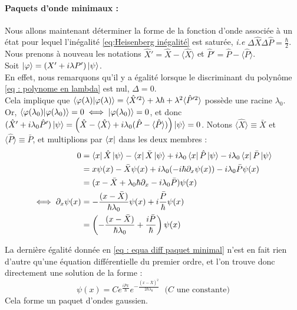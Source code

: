 \documentclass{article}
\begin{document}
\paragraph{Paquets d'onde minimaux :} Nous allons maintenant déterminer la forme de la fonction d'onde associée à un état pour lequel l'inégalité \eqref{eq:Heisenberg inégalité} est saturée, \textit{i.e} $\Delta \hat{X} \Delta \hat{P} = \frac{\hbar}{2}$. \\

Nous prenons à nouveau les notations $\hat{X}' = \hat{X} - \langle \hat{X} \rangle$ et $\hat{P}' = \hat{P} - \langle \hat{P} \rangle$. \\
Soit $\ket{\varphi} = (X' + i\lambda P') \ket{\psi}$. \\
En effet, nous remarquons qu'il y a égalité lorsque le discriminant du polynôme \eqref{eq : polynome en lambda} est nul, $\Delta = 0$. \\
Cela implique que $\braket{\varphi(\lambda) | \varphi(\lambda)} =  \langle \hat{X}'^2 \rangle + \lambda \hbar + \lambda^2 \langle \hat{P}'^2 \rangle$ possède une racine $\lambda_0$. \\
Or, $\braket{\varphi(\lambda_0) | \varphi(\lambda_0)} = 0 \iff \ket{\varphi(\lambda_0)} =0$, et donc $(\hat{X}' + i\lambda_0 \hat{P}')\ket{\psi} = \left( \hat{X} - \langle \hat{X} \rangle + i\lambda_0 (\hat{P} - \langle \hat{P} \rangle) \right) \ket{\psi} =0$.
Notons $\langle \hat{X} \rangle \equiv \bar{X}$ et $\langle \hat{P} \rangle \equiv \bar{P}$, et multiplions par $\bra{x}$ dans les deux membres : \\
\begin{align}
    0&= \bra{x} \hat{X} \ket{\psi} - \bra{x} \bar{X} \ket{\psi} + i \lambda_0 \bra{x} \hat{P} \ket{\psi} - i\lambda_0 \bra{x} \bar{P} \ket{\psi} \notag \\
    &= x \psi(x) - \bar{X} \psi(x) + i\lambda_0(-i\hbar \partial_x \psi(x)) - i\lambda_0 \bar{P} \psi(x) \notag \\
    &= (x - \bar{X} + \lambda_0 \hbar \partial_x -i \lambda_0 \bar{P}) \psi(x) \notag \\
    \iff \partial_x \psi(x) &= - \frac{(x- \bar{X})}{\hbar \lambda_0} \psi(x) + i \frac{\bar{P}}{\hbar} \psi(x) \notag \\
    &= \left( -\frac{(x-\bar{X})}{\hbar \lambda_0} + \frac{i\bar{P}}{\hbar} \right) \psi(x) \label{eq : equa diff paquet minimal}
\end{align}

La dernière égalité donnée en \eqref{eq : equa diff paquet minimal} n'est en fait rien d'autre qu'une équation différentielle du premier ordre, et l'on trouve donc directement une solution de la forme : 
\begin{equation}
    \psi(x) = C e^{\frac{i\bar{P}x}{\hbar}} e^{-\frac{(x-\bar{X})^2}{2\hbar \lambda_0}} \; \mbox{ ($C$ une constante)}
\end{equation} 
Cela forme un paquet d'ondes gaussien. \\
\end{document}
